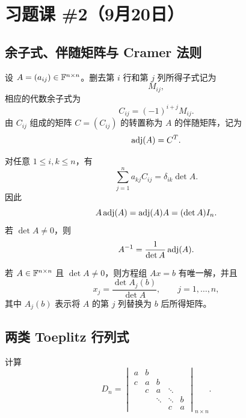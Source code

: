 \section{习题课 \#2（9月20日）}

\subsection{余子式、伴随矩阵与 Cramer 法则}

\begin{definition}
设 $A=(a_{ij})\in\mathbb F^{n\times n}$。删去第 $i$ 行和第 $j$ 列所得子式记为
\begin{equation}
 M_{ij},
\end{equation}
相应的代数余子式为
\begin{equation}
 C_{ij}=(-1)^{i+j}M_{ij}.
\end{equation}
由 $C_{ij}$ 组成的矩阵 $C=(C_{ij})$ 的转置称为 $A$ 的伴随矩阵，记为
\begin{equation}
 \operatorname{adj}(A)=C^T.
\end{equation}
\end{definition}

\begin{theorem}
对任意 $1\leq i,k\leq n$，有
\begin{equation}
 \sum_{j=1}^n a_{kj}C_{ij}=\delta_{ik}\det A.
\end{equation}
因此
\begin{equation}
 A\operatorname{adj}(A)=\operatorname{adj}(A)A=(\det A)I_n.
\end{equation}
若 $\det A\neq0$，则
\begin{equation}
 A^{-1}=\frac{1}{\det A}\operatorname{adj}(A).
\end{equation}
\end{theorem}

\begin{corollary}[Cramer 法则]
若 $A\in\mathbb F^{n\times n}$ 且 $\det A\neq0$，则方程组 $Ax=b$ 有唯一解，并且
\begin{equation}
 x_j=\frac{\det A_j(b)}{\det A},
 \qquad j=1,\ldots,n,
\end{equation}
其中 $A_j(b)$ 表示将 $A$ 的第 $j$ 列替换为 $b$ 后所得矩阵。
\end{corollary}

\subsection{两类 Toeplitz 行列式}

\begin{exercise}
计算
\begin{equation}
 D_n=\begin{vmatrix}
 a&b&&&\\
 c&a&b&&\\
 &c&a&\ddots&\\
 &&\ddots&\ddots&b\\
 &&&c&a
 \end{vmatrix}_{n\times n}.
\end{equation}
\end{exercise}

